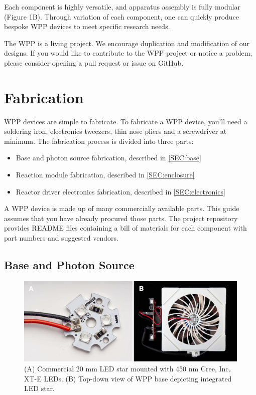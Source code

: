 \documentclass[11pt]{article}
\let\stdsection\section
\renewcommand\section{\clearpage\stdsection}
\begin{document}
Each component is highly versatile, and apparatus assembly is fully modular (Figure 1B).
Through variation of each component, one can quickly produce bespoke WPP devices to meet specific research needs.

The WPP is a living project.
We encourage duplication and modification of our designs.
If you would like to contribute to the WPP project or notice a problem, please consider opening a pull request or issue on GitHub.

\section{Fabrication}

WPP devices are simple to fabricate.
To fabricate a WPP device, you'll need a soldering iron, electronics tweezers, thin nose pliers and a screwdriver at minimum.
The fabrication process is divided into three parts:

\begin{itemize}
	\item Base and photon source fabrication, described in \autoref{SEC:base}
	\item Reaction module fabrication, described in \autoref{SEC:enclosure}
	\item Reactor driver electronics fabrication, described in \autoref{SEC:electronics}
\end{itemize}

A WPP device is made up of many commercially available parts.
This guide assumes that you have already procured those parts.
The project repository provides README files containing a bill of materials for each component with part numbers and suggested vendors.

\subsection{Base and Photon Source} \label{SEC:base}

\begin{figure}[H]
	\includegraphics[width=\textwidth]{"./fig2.png"}
	\caption{(A) Commercial 20 mm LED star mounted with 450 nm Cree, Inc. XT-E LEDs. (B) Top-down view of WPP base depicting integrated LED star.}
\end{figure}
\end{document}
